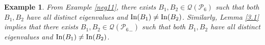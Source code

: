 \documentclass[a4paper, 10pt]{article}
\newtheorem{eg}{Example}[section]
\numberwithin{equation}{section}
\def\In{{\rm In}}
\begin{document}
\begin{eg} \label{eg2.21}
	From Example \ref{neg11}, there exists $B_1, B_2 \in \mathcal{Q}(\mathcal{P}_6)$ such that both $B_1, B_2$ have all distinct eigenvalues and
	$\In(B_1)\neq \In(B_2)$. Similarly, Lemma \ref{3.1} implies that there exists $B_1, B_2 \in \mathcal{Q}({\mathcal{P}_{6}}_-)$ such that both $B_1, B_2$ have all distinct eigenvalues and $\In(B_1)\neq \In(B_2)$.
\end{eg}












\end{document}

